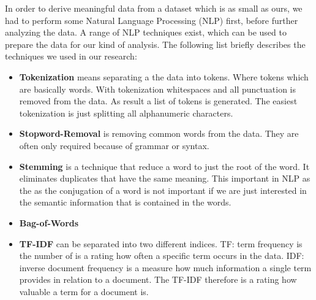In order to derive meaningful data from a dataset which is as small as ours, we had to perform some Natural Language Processing (NLP) first, before further analyzing the data. A range of NLP techniques exist, which can be used to prepare the data for our kind of analysis\cite{solangi_review_2018}\cite{ferrari_natural_2018}. The following list briefly describes the techniques we used in our research:

\begin{itemize}
	\item \textbf{Tokenization} means separating a the data into tokens. Where tokens which are basically words. With tokenization whitespaces and all punctuation is removed from the data. As result a list of tokens is generated. The easiest tokenization is just splitting all alphanumeric characters.
	\item \textbf{Stopword-Removal} is removing common words from the data. They are often only required because of grammar or syntax.
	\item \textbf{Stemming} is a technique that reduce a word to just the root of the word. It eliminates duplicates that have the same meaning. This important in NLP as the as the conjugation of a word is not important if we are just interested in the semantic information that is contained in the words.
	\item \textbf{Bag-of-Words}
	\item \textbf{TF-IDF} can be separated into two different indices. TF: term frequency is the number of is a rating how often a specific term occurs in the data. IDF: inverse document frequency is a measure how much information a single term provides in relation to a document. The TF-IDF therefore is a rating how valuable a term for a document is.
\end{itemize}